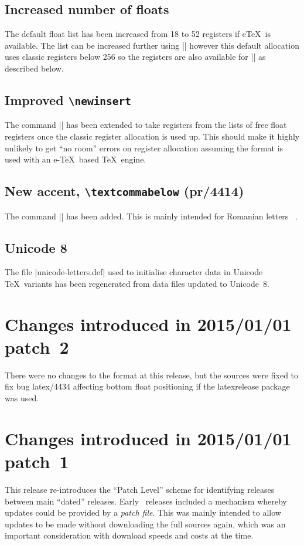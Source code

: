 \documentclass{ltxguide}
\newcommand\Lpack[1]{\mbox{\textsf{#1}}}
\begin{document}
\subsection{Increased number of floats}
The default float list has been increased from 18 to 52 registers if
e\TeX\ is available.
The list can be increased further using |\extrafloats| however this
default allocation uses classic registers below 256 so the registers are
also available for |\newinsert| as described below.

\subsection{Improved \texttt{\textbackslash newinsert}}
The command |\newinsert| has been extended to take registers from the lists of free float
registers once the classic register allocation is used up. This should make it highly unlikely
to get ``no room'' errors on register allocation assuming the format is used with
an e-\TeX\ based \TeX\ engine.

\subsection{New accent, \texttt{\textbackslash textcommabelow} (pr/4414)}
The command |\textcommabelow| has been added. This is mainly intended for Romanian letters
\,\,\,.

\subsection{Unicode 8}
The file |unicode-letters.def| used to initialise character data in
Unicode \TeX\ variants has been regenerated from data files updated
to Unicode~8.

\section{Changes  introduced in 2015/01/01 patch~2}
There were no changes to the format at this release, but the sources were fixed to fix bug latex/4434
affecting bottom float positioning if the \Lpack{latexrelease} package was used.

\section{Changes  introduced in 2015/01/01 patch~1}
This release re-introduces the ``Patch Level'' scheme for identifying
releases between main ``dated'' releases. Early \LaTeXe\ releases
included a mechanism whereby updates could be provided by a 
\emph{patch
  file}. This was mainly intended to allow updates to be made without
downloading the full sources again, which was an important
consideration with download speeds and costs at the time.
\end{document}
